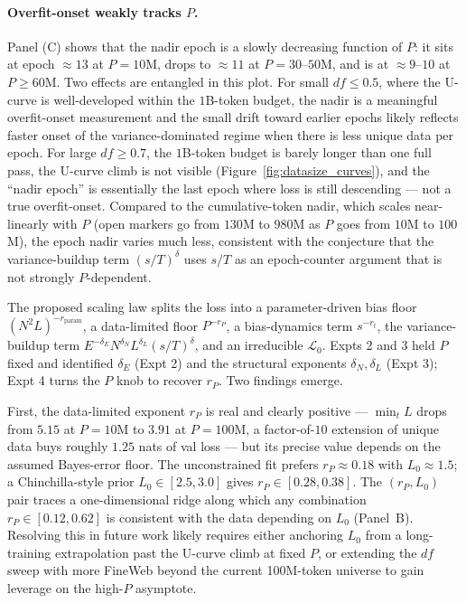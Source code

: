 \paragraph{Overfit-onset weakly tracks $P$.}
Panel (C) shows that the nadir epoch is a slowly decreasing function of $P$: it sits at epoch $\approx 13$ at $P = 10$M, drops to $\approx 11$ at $P = 30$--$50$M, and is at $\approx 9$--$10$ at $P \geq 60$M.
Two effects are entangled in this plot.
For small $df \leq 0.5$, where the U-curve is well-developed within the $1$B-token budget, the nadir is a meaningful overfit-onset measurement and the small drift toward earlier epochs likely reflects faster onset of the variance-dominated regime when there is less unique data per epoch.
For large $df \geq 0.7$, the $1$B-token budget is barely longer than one full pass, the U-curve climb is not visible (Figure~\ref{fig:datasize_curves}), and the ``nadir epoch'' is essentially the last epoch where loss is still descending --- not a true overfit-onset.
Compared to the cumulative-token nadir, which scales near-linearly with $P$ (open markers go from $130$M to $980$M as $P$ goes from $10$M to $100$M), the epoch nadir varies much less, consistent with the conjecture that the variance-buildup term $(s/T)^\delta$ uses $s/T$ as an epoch-counter argument that is not strongly $P$-dependent.



The proposed scaling law splits the loss into a parameter-driven bias floor $(N^2 L)^{-r_{\mathrm{param}}}$, a data-limited floor $P^{-r_P}$, a bias-dynamics term $s^{-r_t}$, the variance-buildup term $E^{-\delta_E} N^{\delta_N} L^{\delta_L} (s/T)^\delta$, and an irreducible $\mathcal{L}_0$.
Expts 2 and 3 held $P$ fixed and identified $\delta_E$ (Expt 2) and the structural exponents $\delta_N, \delta_L$ (Expt 3); Expt 4 turns the $P$ knob to recover $r_P$.
Two findings emerge.

First, the data-limited exponent $r_P$ is real and clearly positive --- $\min_t L$ drops from $5.15$ at $P = 10$M to $3.91$ at $P = 100$M, a factor-of-$10$ extension of unique data buys roughly $1.25$ nats of val loss --- but its precise value depends on the assumed Bayes-error floor.
The unconstrained fit prefers $r_P \approx 0.18$ with $L_0 \approx 1.5$; a Chinchilla-style prior $L_0 \in [2.5, 3.0]$ gives $r_P \in [0.28, 0.38]$.
The $(r_P, L_0)$ pair traces a one-dimensional ridge along which any combination $r_P \in [0.12, 0.62]$ is consistent with the data depending on $L_0$ (Panel~B).
Resolving this in future work likely requires either anchoring $L_0$ from a long-training extrapolation past the U-curve climb at fixed $P$, or extending the $df$ sweep with more FineWeb beyond the current 100M-token universe to gain leverage on the high-$P$ asymptote.


